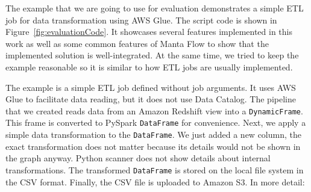The example that we are going to use for evaluation demonstrates a simple ETL job for data transformation using AWS Glue. The script code is shown in Figure~\ref{fig:evaluationCode}. It showcases several features implemented in this work as well as some common features of Manta Flow to show that the implemented solution is well-integrated. At the same time, we tried to keep the example reasonable so it is similar to how ETL jobs are usually implemented.
\par
The example is a simple ETL job defined without job arguments. It uses AWS Glue to facilitate data reading, but it does not use Data Catalog. The pipeline that we created reads data from an Amazon Redshift view into a \texttt{DynamicFrame}. This frame is converted to PySpark \texttt{DataFrame} for convenience. Next, we apply a simple data transformation to the \texttt{DataFrame}. We just added a new column, the exact transformation does not matter because its details would not be shown in the graph anyway. Python scanner does not show details about internal transformations. The transformed \texttt{DataFrame} is stored on the local file system in the CSV format. Finally, the CSV file is uploaded to Amazon S3. In more detail:
